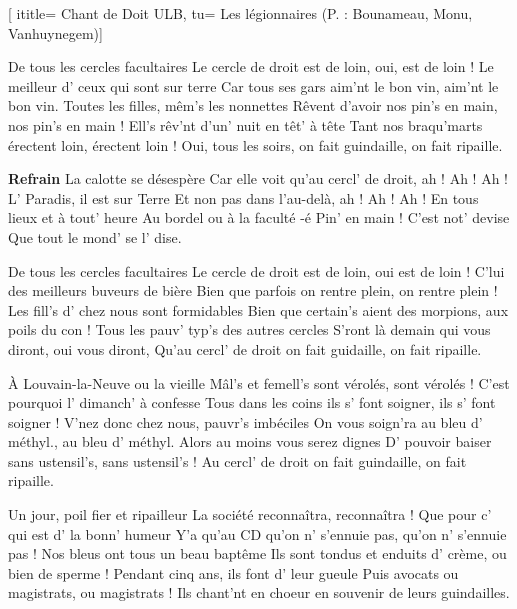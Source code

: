 [
ititle= {Chant de Doit ULB},
tu= {Les légionnaires (P. : Bounameau, Monu, Vanhuynegem)}]


\beginverse
De tous les cercles facultaires
Le cercle de droit est de loin, oui, est de loin !
Le meilleur d' ceux qui sont sur terre
Car tous ses gars aim'nt le bon vin, aim'nt le bon vin.
Toutes les filles, mêm's les nonnettes
Rêvent d'avoir nos pin's en main, nos pin's en main !
Ell's rêv'nt d'un' nuit en têt' à tête
Tant nos braqu'marts érectent loin, érectent loin !
Oui, tous les soirs, on fait guindaille, on fait ripaille.
\endverse

\beginchorus
\textbf {Refrain}
La calotte se désespère
Car elle voit qu'au cercl' de droit, ah ! Ah ! Ah !
L' Paradis, il est sur Terre
Et non pas dans l'au-delà, ah ! Ah ! Ah !
En tous lieux et à tout' heure
Au bordel ou à la faculté -é
Pin' en main ! C'est not' devise
Que tout le mond' se l' dise.
\endchorus

\beginverse
De tous les cercles facultaires
Le cercle de droit est de loin, oui est de loin !
C'lui des meilleurs buveurs de bière
Bien que parfois on rentre plein, on rentre plein !
Les fill's d' chez nous sont formidables
Bien que certain's aient des morpions, aux poils du con !
Tous les pauv' typ's des autres cercles
S'ront là demain qui vous diront, oui vous diront,
Qu'au cercl' de droit on fait guidaille, on fait ripaille.
\endverse

\beginverse
À Louvain-la-Neuve ou la vieille
Mâl's et femell's sont vérolés, sont vérolés !
C'est pourquoi l' dimanch' à confesse
Tous dans les coins ils s' font soigner, ils s' font soigner !
V'nez donc chez nous, pauvr's imbéciles
On vous soign'ra au bleu d' méthyl., au bleu d' méthyl.
Alors au moins vous serez dignes
D' pouvoir baiser sans ustensil's, sans ustensil's !
Au cercl' de droit on fait guindaille, on fait ripaille.
\endverse

\beginverse
Un jour, poil fier et ripailleur
La société reconnaîtra, reconnaîtra !
Que pour c' qui est d' la bonn' humeur
Y'a qu'au CD qu'on n' s'ennuie pas, qu'on n' s'ennuie pas !
Nos bleus ont tous un beau baptême
Ils sont tondus et enduits d' crème, ou bien de sperme !
Pendant cinq ans, ils font d' leur gueule
Puis avocats ou magistrats, ou magistrats !
Ils chant'nt en choeur en souvenir de leurs guindailles.
\endverse

\endsong
